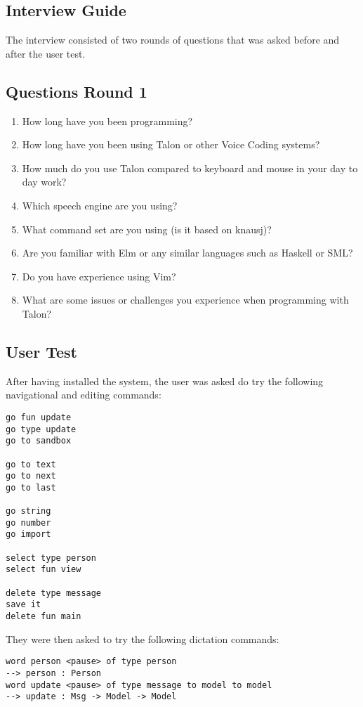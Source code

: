 
\appendix
\begin{appendices}
\chapter{Interview Guide}\label{interview_guide}
The interview consisted of two rounds of questions that was asked
before and after the user test.

\section{Questions Round 1}
\begin{enumerate}[label*=Q1.\arabic*]
    \item How long have you been programming?
    \item How long have you been using Talon or other Voice Coding systems?
    \item How much do you use Talon compared to keyboard and mouse in your day to day work?
    \item Which speech engine are you using?
    \item What command set are you using (is it based on knausj)?
    \item Are you familiar with Elm or any similar languages such as Haskell or SML?
    \item Do you have experience using Vim?
    \item What are some issues or challenges you experience when programming with Talon?
\end{enumerate}

\newpage
\section{User Test}

After having installed the system, the user was asked do try the following
navigational and editing commands:
\begin{verbatim}
go fun update
go type update
go to sandbox

go to text
go to next
go to last

go string
go number
go import

select type person
select fun view

delete type message
save it
delete fun main
\end{verbatim}
They were then asked to try the following dictation commands:
\begin{verbatim}
word person <pause> of type person 
--> person : Person
word update <pause> of type message to model to model 
--> update : Msg -> Model -> Model
\end{verbatim}

\end{appendices}
